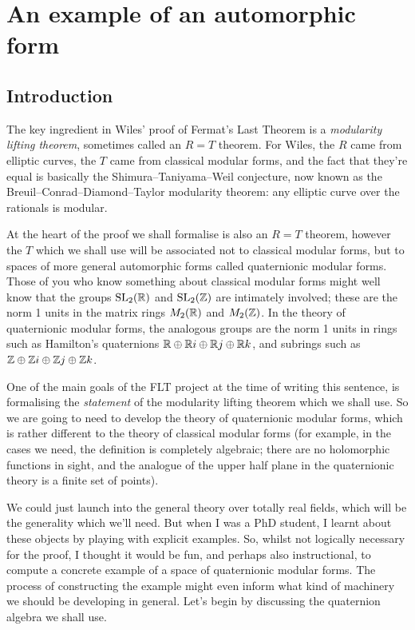 \chapter{An example of an automorphic form}

\section{Introduction}

The key ingredient in Wiles' proof of Fermat's Last Theorem is a \emph{modularity lifting theorem},
sometimes called an $R=T$ theorem. For Wiles, the $R$ came from elliptic curves, the $T$ came from 
classical modular forms, and the fact that they're equal is basically the Shimura--Taniyama--Weil 
conjecture, now known as the Breuil--Conrad--Diamond--Taylor modularity theorem: any elliptic
curve over the rationals is modular.

At the heart of the proof we shall formalise is also an $R=T$ theorem, however the $T$ which we
shall use will be associated not to classical modular forms, but to spaces of more general
automorphic forms called quaternionic modular forms. Those of you who know something about
classical modular forms might well know that the groups $\operatorname{SL}_2(\mathbb{R})$ and $\operatorname{SL}_2(\mathbb{Z})$ are
intimately involved; these are the norm 1 units in the matrix rings $M_2(\mathbb{R})$ and $M_2(\mathbb{Z})$. 
In the theory of quaternionic modular forms, the analogous groups are the norm 1 units
in rings such as Hamilton's quaternions $\mathbb{R}\oplus\mathbb{R} i\oplus\mathbb{R} j\oplus\mathbb{R} k$, and subrings
such as $\mathbb{Z}\oplus\mathbb{Z} i\oplus\mathbb{Z} j\oplus\mathbb{Z} k$.

One of the main goals of the FLT project at the time of writing this sentence, is formalising
the \emph{statement} of the modularity lifting theorem which we shall use. So we are going
to need to develop the theory of quaternionic modular forms, which is rather different
to the theory of classical modular forms (for example, in the cases we need, the definition 
is completely algebraic; there are no holomorphic functions in sight, and the analogue
of the upper half plane in the quaternionic theory is a finite set of points).

We could just launch into the general theory over totally real fields, which will be the generality
which we'll need. But when I was a PhD student, I learnt about
these objects by playing with explicit examples. So, whilst not logically necessary for the proof,
I thought it would be fun, and perhaps also instructional, to compute a concrete example of a space 
of quaternionic modular forms. The process of constructing the example might even inform what kind
of machinery we should be developing in general. Let's begin by discussing the quaternion algebra 
we shall use.

